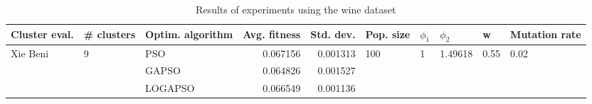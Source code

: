 \begin{table}
\centering
\caption{Results of experiments using the wine dataset}
\begin{tabular}{lllrrlllll}
\toprule
            Cluster eval. &        \# clusters & Optim. algorithm &  Avg. fitness &  Std. dev. &            Pop. size &         $\phi_{1}$ &               $\phi_{2}$ &                     w &         Mutation rate \\
\midrule
\multirow{3}{*}{Xie Beni} & \multirow{3}{*}{9} &              PSO &      0.067156 &   0.001313 & \multirow{3}{*}{100} & \multirow{3}{*}{1} & \multirow{3}{*}{1.49618} & \multirow{3}{*}{0.55} & \multirow{3}{*}{0.02} \\
                          &                    &            GAPSO &      0.064826 &   0.001527 &                      &                    &                          &                       &                       \\
                          &                    &          LOGAPSO &      0.066549 &   0.001136 &                      &                    &                          &                       &                       \\
\bottomrule
\end{tabular}
\end{table}
